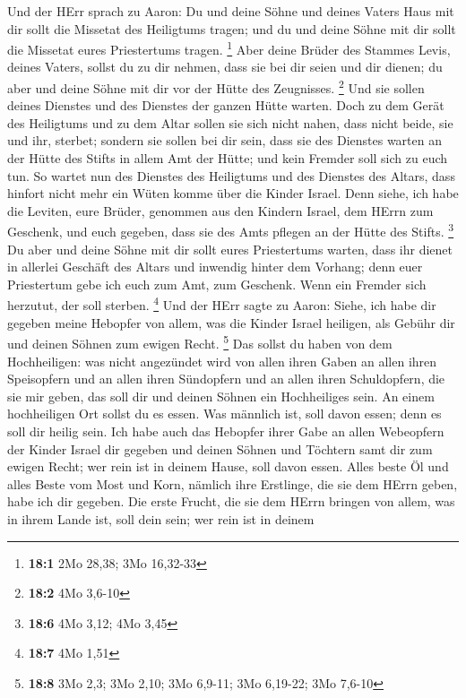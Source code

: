  Und der HErr sprach zu Aaron: Du und deine Söhne und deines
Vaters Haus mit dir sollt die Missetat des Heiligtums tragen; und du und
deine Söhne mit dir sollt die Missetat eures Priestertums tragen.
\footnote{\textbf{18:1} 2Mo 28,38; 3Mo 16,32-33}  Aber deine
Brüder des Stammes Levis, deines Vaters, sollst du zu dir nehmen, dass
sie bei dir seien und dir dienen; du aber und deine Söhne mit dir vor
der Hütte des Zeugnisses. \footnote{\textbf{18:2} 4Mo 3,6-10}
 Und sie sollen deines Dienstes und des Dienstes der ganzen
Hütte warten. Doch zu dem Gerät des Heiligtums und zu dem Altar sollen
sie sich nicht nahen, dass nicht beide, sie und ihr, sterbet;
 sondern sie sollen bei dir sein, dass sie des Dienstes
warten an der Hütte des Stifts in allem Amt der Hütte; und kein Fremder
soll sich zu euch tun.  So wartet nun des Dienstes des
Heiligtums und des Dienstes des Altars, dass hinfort nicht mehr ein
Wüten komme über die Kinder Israel.  Denn siehe, ich habe
die Leviten, eure Brüder, genommen aus den Kindern Israel, dem HErrn zum
Geschenk, und euch gegeben, dass sie des Amts pflegen an der Hütte des
Stifts. \footnote{\textbf{18:6} 4Mo 3,12; 4Mo 3,45}  Du aber
und deine Söhne mit dir sollt eures Priestertums warten, dass ihr dienet
in allerlei Geschäft des Altars und inwendig hinter dem Vorhang; denn
euer Priestertum gebe ich euch zum Amt, zum Geschenk. Wenn ein Fremder
sich herzutut, der soll sterben. \footnote{\textbf{18:7} 4Mo 1,51}
 Und der HErr sagte zu Aaron: Siehe, ich habe dir gegeben
meine Hebopfer von allem, was die Kinder Israel heiligen, als Gebühr dir
und deinen Söhnen zum ewigen Recht. \footnote{\textbf{18:8} 3Mo 2,3; 3Mo
  2,10; 3Mo 6,9-11; 3Mo 6,19-22; 3Mo 7,6-10}  Das sollst du
haben von dem Hochheiligen: was nicht angezündet wird von allen ihren
Gaben an allen ihren Speisopfern und an allen ihren Sündopfern und an
allen ihren Schuldopfern, die sie mir geben, das soll dir und deinen
Söhnen ein Hochheiliges sein.  An einem hochheiligen Ort
sollst du es essen. Was männlich ist, soll davon essen; denn es soll dir
heilig sein.  Ich habe auch das Hebopfer ihrer Gabe an
allen Webeopfern der Kinder Israel dir gegeben und deinen Söhnen und
Töchtern samt dir zum ewigen Recht; wer rein ist in deinem Hause, soll
davon essen.  Alles beste Öl und alles Beste vom Most und
Korn, nämlich ihre Erstlinge, die sie dem HErrn geben, habe ich dir
gegeben.  Die erste Frucht, die sie dem HErrn bringen von
allem, was in ihrem Lande ist, soll dein sein; wer rein ist in deinem
